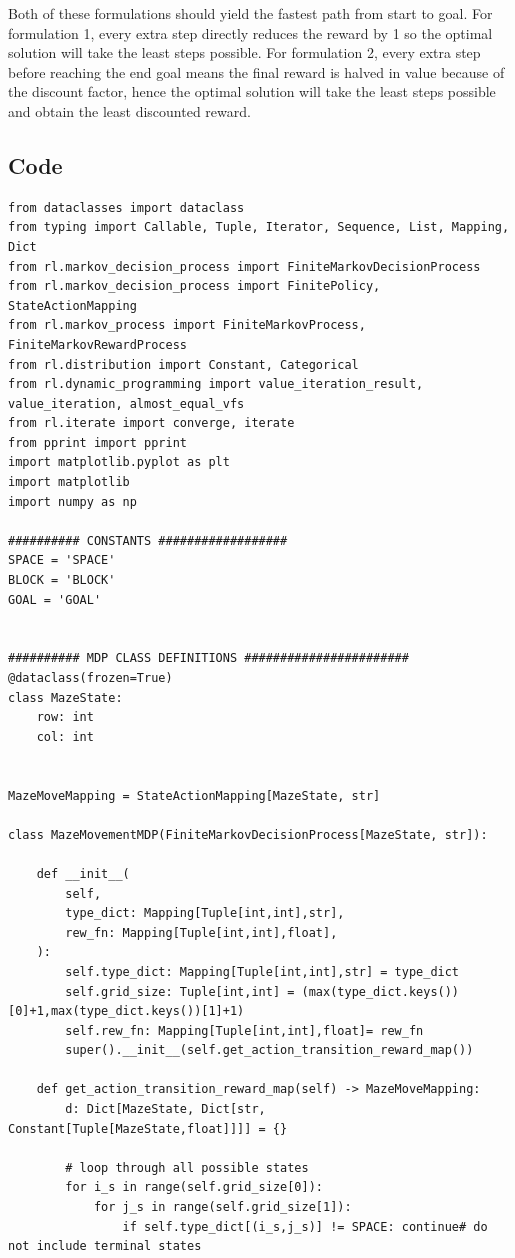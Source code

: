 \documentclass{article}[12pt]
\begin{document}
Both of these formulations should yield the fastest path from start to goal. For formulation 1, every extra step directly reduces the reward by 1 so the optimal solution will take the least steps possible. For formulation 2, every extra step before reaching the end goal means the final reward is halved in value because of the discount factor, hence the optimal solution will take the least steps possible and obtain the least discounted reward.

\subsection{Code}
\begin{lstlisting}
from dataclasses import dataclass
from typing import Callable, Tuple, Iterator, Sequence, List, Mapping, Dict
from rl.markov_decision_process import FiniteMarkovDecisionProcess
from rl.markov_decision_process import FinitePolicy, StateActionMapping
from rl.markov_process import FiniteMarkovProcess, FiniteMarkovRewardProcess
from rl.distribution import Constant, Categorical
from rl.dynamic_programming import value_iteration_result, value_iteration, almost_equal_vfs
from rl.iterate import converge, iterate
from pprint import pprint
import matplotlib.pyplot as plt
import matplotlib
import numpy as np

########## CONSTANTS ##################
SPACE = 'SPACE'
BLOCK = 'BLOCK'
GOAL = 'GOAL'


########## MDP CLASS DEFINITIONS #######################
@dataclass(frozen=True)
class MazeState:
    row: int
    col: int


MazeMoveMapping = StateActionMapping[MazeState, str]

class MazeMovementMDP(FiniteMarkovDecisionProcess[MazeState, str]):

    def __init__(
        self,
        type_dict: Mapping[Tuple[int,int],str],
        rew_fn: Mapping[Tuple[int,int],float],
    ):
        self.type_dict: Mapping[Tuple[int,int],str] = type_dict
        self.grid_size: Tuple[int,int] = (max(type_dict.keys())[0]+1,max(type_dict.keys())[1]+1)
        self.rew_fn: Mapping[Tuple[int,int],float]= rew_fn
        super().__init__(self.get_action_transition_reward_map())

    def get_action_transition_reward_map(self) -> MazeMoveMapping:
        d: Dict[MazeState, Dict[str, Constant[Tuple[MazeState,float]]]] = {}

        # loop through all possible states
        for i_s in range(self.grid_size[0]):
            for j_s in range(self.grid_size[1]):
                if self.type_dict[(i_s,j_s)] != SPACE: continue# do not include terminal states


\end{lstlisting}
\end{document}

